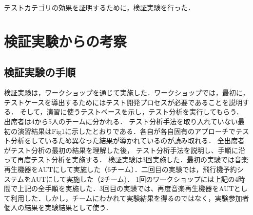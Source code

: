 \documentclass[a4paper,12pt]{jreport}
\begin{document}
テストカテゴリの効果を証明するために，検証実験を行った．

\section{検証実験からの考察}
\subsection{検証実験の手順}

検証実験は，ワークショップを通じて実施した．ワークショップでは，最初に，テストケースを導出するためにはテスト開発プロセスが必要であることを説明する．
そして，演習に使うテストベースを示し，テスト分析を実行してもらう．出席者は4から5人のチームに分かれる．
テスト分析手法を取り入れていない最初の演習結果はFig1に示したとおりである．各自が各自固有のアプローチでテスト分析をしているため異なった結果が導かれているのが読み取れる．
全出席者がテスト分析の最初の結果を理解した後， テスト分析手法を説明し、手順に沿って再度テスト分析を実施する．
検証実験は3回実施した．最初の実験では音楽再生機器をAUTにして実施した（6チーム）．二回目の実験では，飛行機予約システムをAUTにして実施した（2チーム)．
1回のワークショップには上記の4時間で上記の全手順を実施した．3回目の実験では、再度音楽再生機器をAUTとして利用した．しかし，チームにわかれて実験結果を得るのではなく，実験参加者個人の結果を実験結果として使う．
\end{document}
